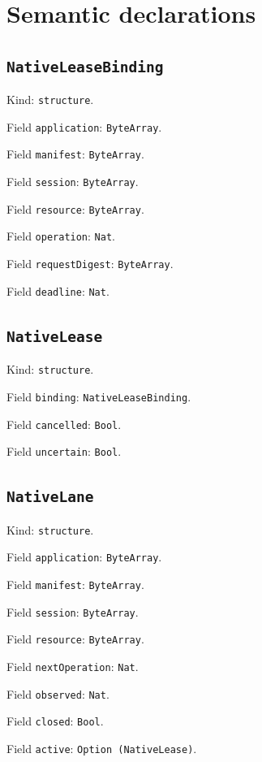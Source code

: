\documentclass[11pt]{article}
\begin{document}
\section*{Semantic declarations}
\subsection*{\texttt{NativeLeaseBinding}}
\noindent Kind: \texttt{structure}.\par
\noindent Field \texttt{application}: \texttt{ByteArray}.\par
\noindent Field \texttt{manifest}: \texttt{ByteArray}.\par
\noindent Field \texttt{session}: \texttt{ByteArray}.\par
\noindent Field \texttt{resource}: \texttt{ByteArray}.\par
\noindent Field \texttt{operation}: \texttt{Nat}.\par
\noindent Field \texttt{requestDigest}: \texttt{ByteArray}.\par
\noindent Field \texttt{deadline}: \texttt{Nat}.\par
\subsection*{\texttt{NativeLease}}
\noindent Kind: \texttt{structure}.\par
\noindent Field \texttt{binding}: \texttt{NativeLeaseBinding}.\par
\noindent Field \texttt{cancelled}: \texttt{Bool}.\par
\noindent Field \texttt{uncertain}: \texttt{Bool}.\par
\subsection*{\texttt{NativeLane}}
\noindent Kind: \texttt{structure}.\par
\noindent Field \texttt{application}: \texttt{ByteArray}.\par
\noindent Field \texttt{manifest}: \texttt{ByteArray}.\par
\noindent Field \texttt{session}: \texttt{ByteArray}.\par
\noindent Field \texttt{resource}: \texttt{ByteArray}.\par
\noindent Field \texttt{nextOperation}: \texttt{Nat}.\par
\noindent Field \texttt{observed}: \texttt{Nat}.\par
\noindent Field \texttt{closed}: \texttt{Bool}.\par
\noindent Field \texttt{active}: \texttt{Option (NativeLease)}.\par
\end{document}
